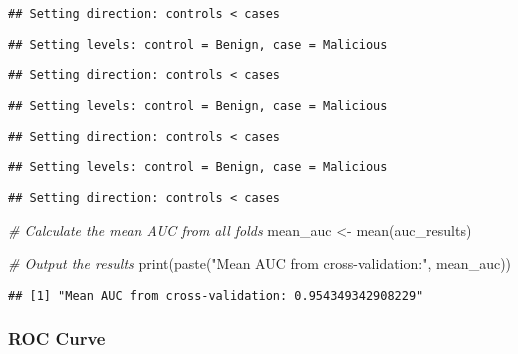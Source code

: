 \documentclass[
]{article}
\newenvironment{Shaded}{\begin{snugshade}}{\end{snugshade}}
\newcommand{\AttributeTok}[1]{\textcolor[rgb]{0.77,0.63,0.00}{#1}}
\newcommand{\CommentTok}[1]{\textcolor[rgb]{0.56,0.35,0.01}{\textit{#1}}}
\newcommand{\FunctionTok}[1]{\textcolor[rgb]{0.00,0.00,0.00}{#1}}
\newcommand{\NormalTok}[1]{#1}
\newcommand{\OtherTok}[1]{\textcolor[rgb]{0.56,0.35,0.01}{#1}}
\newcommand{\SpecialCharTok}[1]{\textcolor[rgb]{0.00,0.00,0.00}{#1}}
\newcommand{\StringTok}[1]{\textcolor[rgb]{0.31,0.60,0.02}{#1}}
\begin{document}
\begin{verbatim}
## Setting direction: controls < cases
\end{verbatim}

\begin{verbatim}
## Setting levels: control = Benign, case = Malicious
\end{verbatim}

\begin{verbatim}
## Setting direction: controls < cases
\end{verbatim}

\begin{verbatim}
## Setting levels: control = Benign, case = Malicious
\end{verbatim}

\begin{verbatim}
## Setting direction: controls < cases
\end{verbatim}

\begin{verbatim}
## Setting levels: control = Benign, case = Malicious
\end{verbatim}

\begin{verbatim}
## Setting direction: controls < cases
\end{verbatim}

\begin{Shaded}
\begin{Highlighting}[]
\CommentTok{\# Calculate the mean AUC from all folds}
\NormalTok{mean\_auc }\OtherTok{\textless{}{-}} \FunctionTok{mean}\NormalTok{(auc\_results)}

\CommentTok{\# Output the results}
\FunctionTok{print}\NormalTok{(}\FunctionTok{paste}\NormalTok{(}\StringTok{"Mean AUC from cross{-}validation:"}\NormalTok{, mean\_auc))}
\end{Highlighting}
\end{Shaded}

\begin{verbatim}
## [1] "Mean AUC from cross-validation: 0.954349342908229"
\end{verbatim}

\hypertarget{roc-curve}{%
\subsubsection{ROC Curve}\label{roc-curve}}

\begin{Shaded}
\end{Shaded}
\end{document}
